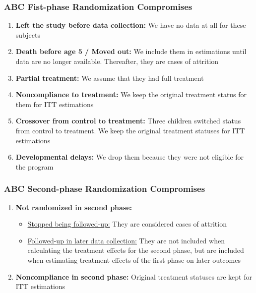 \documentclass[static]{JJH-Beamer}
\begin{document}
\begin{frame}\frametitle{ABC Fist-phase Randomization Compromises}
\begin{enumerate}
\item \textbf{Left the study before data collection:} We have no data at all for these subjects 
\item \textbf{Death before age 5 / Moved out:} We include them in estimations until data are no longer available. Thereafter, they are cases of attrition 
\item \textbf{Partial treatment:} We assume that they had full treatment
\item \textbf{Noncompliance to treatment:} We keep the original treatment status for them for ITT estimations
\item \textbf{Crossover from control to treatment:} Three children switched status from control to treatment. We keep the original treatment statuses for ITT estimations
\item \textbf{Developmental delays:} We drop them because they were not eligible for the program

\end{enumerate}
\end{frame}


\begin{frame}
	\frametitle{ABC Second-phase Randomization Compromises}
	\begin{enumerate}
	\item \textbf{Not randomized in second phase:}
		\begin{itemize}
		\item \underline{Stopped being followed-up:} They are considered cases of attrition
		\item \underline{Followed-up in later data collection:} They are not included when calculating the treatment effects for the second phase, but are included when estimating treatment effects of the first phase on later outcomes
		\end{itemize}
	\item \textbf{Noncompliance in second phase:} Original treatment statuses are kept for ITT estimations
	\end{enumerate}
\end{frame}

\end{document}
